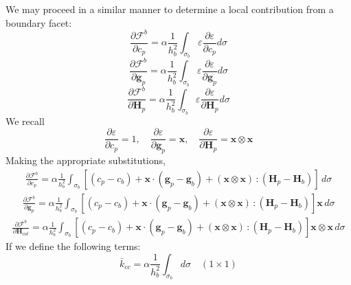 \documentclass[11pt]{article} %
\begin{document}
We may proceed in a similar manner to determine a local contribution from a boundary facet:
\begin{equation}
	\frac{\partial \mathcal{F}^b}{\partial c_p} = \alpha \frac{1}{h_b^2} \int_{\sigma_b} \varepsilon \frac{\partial \varepsilon}{\partial c_p} d \sigma
\end{equation}
\begin{equation}
	\frac{\partial \mathcal{F}^b}{\partial \mathbf{g}_p} = \alpha \frac{1}{h_b^2} \int_{\sigma_b} \varepsilon \frac{\partial \varepsilon}{\partial \mathbf{g}_p} d \sigma
\end{equation}
\begin{equation}
	\frac{\partial \mathcal{F}^b}{\partial \mathbf{H}_{p}} = \alpha \frac{1}{h_b^2} \int_{\sigma_b} \varepsilon \frac{\partial \varepsilon}{\partial \mathbf{H}_{p}} d \sigma
\end{equation}
We recall
\begin{equation}
	\frac{\partial \varepsilon}{\partial c_p} = 1, \quad \frac{\partial \varepsilon}{\partial \mathbf{g}_p} = \mathbf{x}, \quad \frac{\partial \varepsilon}{\partial \mathbf{H}_{p}} = \mathbf{x} \otimes \mathbf{x}
\end{equation}
Making the appropriate substitutions,
\begin{eqnarray}
	\frac{\partial \mathcal{F}^b}{\partial c_p} = \alpha \frac{1}{h_b^2} \int_{\sigma_b} \left[ (c_p - c_b) + \mathbf{x} \cdot (\mathbf{g}_p - \mathbf{g}_b) + (\mathbf{x} \otimes \mathbf{x}) \, \colon (\mathbf{H}_{p} - \mathbf{H}_{b}) \right] \, d \sigma
\end{eqnarray}
\begin{eqnarray}
	\frac{\partial \mathcal{F}^b}{\partial \mathbf{g}_p} = \alpha \frac{1}{h_b^2} \int_{\sigma_b} \left[ (c_p - c_b) + \mathbf{x} \cdot (\mathbf{g}_p - \mathbf{g}_b) + (\mathbf{x} \otimes \mathbf{x}) \, \colon (\mathbf{H}_{p} - \mathbf{H}_{b}) \right] \mathbf{x} \, d \sigma
\end{eqnarray}
\begin{eqnarray}
	\frac{\partial \mathcal{F}^b}{\partial \mathbf{H}_{int}} = \alpha \frac{1}{h_b^2} \int_{\sigma_b} \left[ (c_p - c_b) + \mathbf{x} \cdot (\mathbf{g}_p - \mathbf{g}_b) + (\mathbf{x} \otimes \mathbf{x}) \, \colon (\mathbf{H}_{p} - \mathbf{H}_{b}) \right] \mathbf{x} \otimes \mathbf{x} \, d \sigma
\end{eqnarray}
If we define the following terms:
\begin{equation}
	\bar{k}_{cc} = \alpha \frac{1}{h_b^2} \int_{\sigma_b} d \sigma \quad (1 \times 1)
\end{equation}
\end{document}
